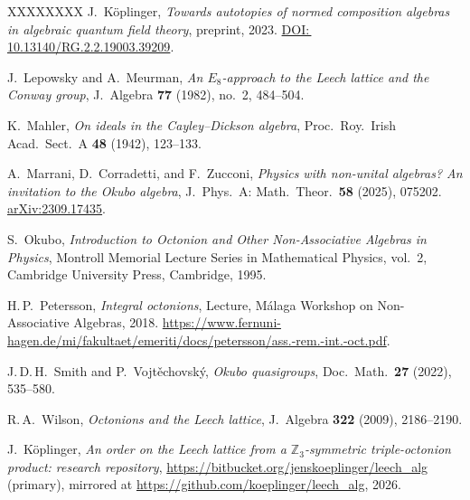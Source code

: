 \documentclass[twoside,english]{paper}
\numberwithin{equation}{section}
\numberwithin{figure}{section}
\theoremstyle{definition}
\theoremstyle{remark}
\newcommand{\ZZ}{\mathbb{Z}}
\begin{document}
\begin{thebibliography}{XXXXXXXX}
J.~K\"oplinger,
\emph{Towards autotopies of normed composition algebras in algebraic
quantum field theory},
preprint, 2023.
\href{https://doi.org/10.13140/RG.2.2.19003.39209}{DOI:\,10.13140/RG.2.2.19003.39209}.

J.~Lepowsky and A.~Meurman,
\emph{An\/ $E_8$-approach to the Leech lattice and the Conway group},
J.~Algebra \textbf{77} (1982), no.~2, 484--504.

K.~Mahler,
\emph{On ideals in the Cayley--Dickson algebra},
Proc.\ Roy.\ Irish Acad.\ Sect.\ A \textbf{48} (1942), 123--133.

A.~Marrani, D.~Corradetti, and F.~Zucconi,
\emph{Physics with non-unital algebras? An invitation to the Okubo
algebra},
J.\ Phys.\ A: Math.\ Theor.\ \textbf{58} (2025), 075202.
\href{https://arxiv.org/abs/2309.17435}{arXiv:2309.17435}.

S.~Okubo,
\emph{Introduction to Octonion and Other Non-Associative Algebras in
Physics},
Montroll Memorial Lecture Series in Mathematical Physics, vol.~2,
Cambridge University Press, Cambridge, 1995.

H.\,P.~Petersson,
\emph{Integral octonions},
Lecture, M\'alaga Workshop on Non-Associative Algebras, 2018.
\url{https://www.fernuni-hagen.de/mi/fakultaet/emeriti/docs/petersson/ass.-rem.-int.-oct.pdf}.

J.\,D.\,H.~Smith and P.~Vojt\v{e}chovsk\'y,
\emph{Okubo quasigroups},
Doc.\ Math.\ \textbf{27} (2022), 535--580.

R.\,A.~Wilson,
\emph{Octonions and the Leech lattice},
J.~Algebra \textbf{322} (2009), 2186--2190.

J.~K\"oplinger,
\emph{An order on the Leech lattice from a $\ZZ_3$-symmetric
triple-octonion product: research repository},
\url{https://bitbucket.org/jenskoeplinger/leech_alg} (primary),
mirrored at \url{https://github.com/koeplinger/leech_alg}, 2026.

\end{thebibliography}
\end{document}

